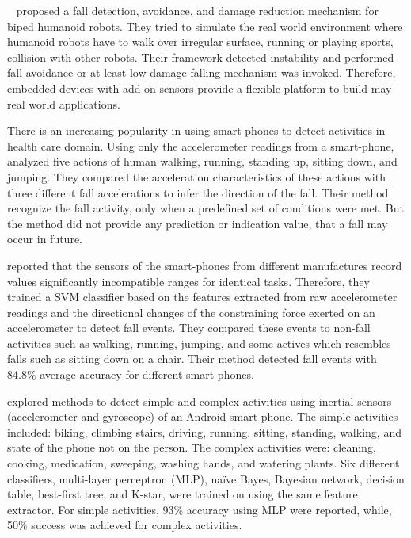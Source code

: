 \documentclass[]{IEEEtran}
\begin{document}
{~\cite{moyaFallAndDamageDetection2015}} proposed a fall detection, avoidance, and damage 
reduction mechanism for biped humanoid robots. They tried to simulate the real world environment 
where humanoid robots have to walk over irregular surface, running or playing sports, collision 
with other robots. Their framework detected instability and performed fall avoidance or at 
least low-damage falling mechanism was invoked. Therefore, embedded devices  with add-on sensors 
provide a flexible platform to build may real world applications. 


There is an increasing popularity in using smart-phones to detect activities in health care domain. 
Using only the accelerometer readings from a smart-phone, \cite{baiFallDetectionPhone2013} analyzed five 
actions of human walking, running, standing up, sitting down, and jumping. They compared the 
acceleration characteristics of these actions with three different fall accelerations to infer the 
direction of the fall. Their method recognize the fall activity, only when a predefined set of 
conditions were met. But the method did not provide any prediction or indication value, that a fall 
may occur in future. 

\cite{steidlFallDetection2012} reported that the sensors of the smart-phones from different manufactures 
record values significantly incompatible ranges for identical tasks. Therefore, they trained a SVM 
classifier based on the features extracted from raw accelerometer readings and the directional 
changes of the constraining force exerted on an accelerometer to detect fall events. They compared 
these events to non-fall activities such as walking, running, jumping, and some actives which 
resembles falls such as sitting down on a chair. Their method detected fall events with 84.8\% average 
accuracy for different smart-phones. 

\cite{DernbachActivityAndFallDetectionPhone2012} explored methods to detect simple and complex activities using inertial 
sensors (accelerometer and gyroscope) of an Android smart-phone. The simple activities included: 
biking, climbing stairs, driving, running, sitting, standing, walking, and state of the phone not 
on the person. The complex activities were: cleaning, cooking, medication, sweeping, washing hands, 
and watering plants. Six different classifiers, multi-layer  perceptron (MLP), na\"{i}ve  Bayes,  
Bayesian  network,  decision  table,  best-first tree, and  K-star,  were trained on using the same 
feature extractor. For simple activities, 93\% accuracy using MLP were reported, while, 50\% 
success was achieved for complex activities.    
\end{document}
